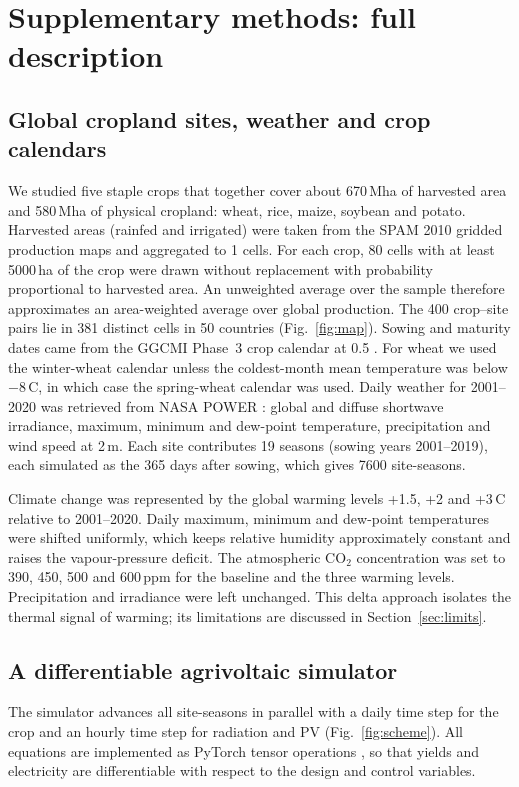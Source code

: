 \section{Supplementary methods: full description}\label{sec:supp-methods}

\subsection{Global cropland sites, weather and crop calendars}\label{sec:data}
We studied five staple crops that together cover about 670\,Mha of harvested area and 580\,Mha of physical cropland: wheat, rice, maize, soybean and potato. Harvested areas (rainfed and irrigated) were taken from the SPAM 2010 gridded production maps \citep{yu2020} and aggregated to 1\textdegree{} cells. For each crop, 80 cells with at least 5000\,ha of the crop were drawn without replacement with probability proportional to harvested area. An unweighted average over the sample therefore approximates an area-weighted average over global production. The 400 crop--site pairs lie in 381 distinct cells in 50 countries (Fig.~\ref{fig:map}). Sowing and maturity dates came from the GGCMI Phase~3 crop calendar at 0.5\textdegree{} \citep{jagermeyr2021}. For wheat we used the winter-wheat calendar unless the coldest-month mean temperature was below $-8$\,\textdegree C, in which case the spring-wheat calendar was used. Daily weather for 2001--2020 was retrieved from NASA POWER \citep{sparks2018}: global and diffuse shortwave irradiance, maximum, minimum and dew-point temperature, precipitation and wind speed at 2\,m. Each site contributes 19 seasons (sowing years 2001--2019), each simulated as the 365 days after sowing, which gives 7600 site-seasons.

Climate change was represented by the global warming levels +1.5, +2 and +3\,\textdegree C relative to 2001--2020. Daily maximum, minimum and dew-point temperatures were shifted uniformly, which keeps relative humidity approximately constant and raises the vapour-pressure deficit. The atmospheric CO$_2$ concentration was set to 390, 450, 500 and 600\,ppm for the baseline and the three warming levels. Precipitation and irradiance were left unchanged. This delta approach isolates the thermal signal of warming; its limitations are discussed in Section~\ref{sec:limits}.

\subsection{A differentiable agrivoltaic simulator}\label{sec:sim}
The simulator advances all site-seasons in parallel with a daily time step for the crop and an hourly time step for radiation and PV (Fig.~\ref{fig:scheme}). All equations are implemented as PyTorch tensor operations \citep{paszke2019}, so that yields and electricity are differentiable with respect to the design and control variables.

